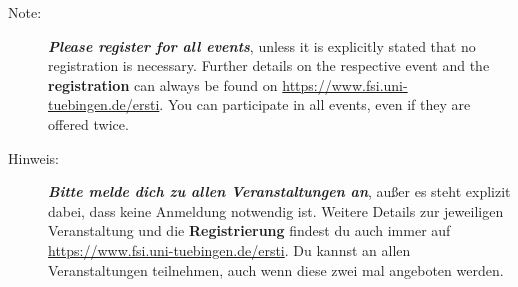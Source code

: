 \begin{description}
  \ifml
    \item[Note:] \textbf{\emph{Please register for all events}}, unless it is explicitly stated that no registration is necessary. Further details on the respective event and the \textbf{registration} can always be found on \url{https://www.fsi.uni-tuebingen.de/ersti}. You can participate in all events, even if they are offered twice.
  \else
    \item[Hinweis:] \textbf{\emph{Bitte melde dich zu allen Veranstaltungen an}}, außer es steht explizit dabei, dass keine Anmeldung notwendig ist. Weitere Details zur jeweiligen Veranstaltung und die \textbf{Registrierung} findest du auch immer auf \url{https://www.fsi.uni-tuebingen.de/ersti}. Du kannst an allen Veranstaltungen teilnehmen, auch wenn diese zwei mal angeboten werden.
  \fi


%
%


\end{description}
